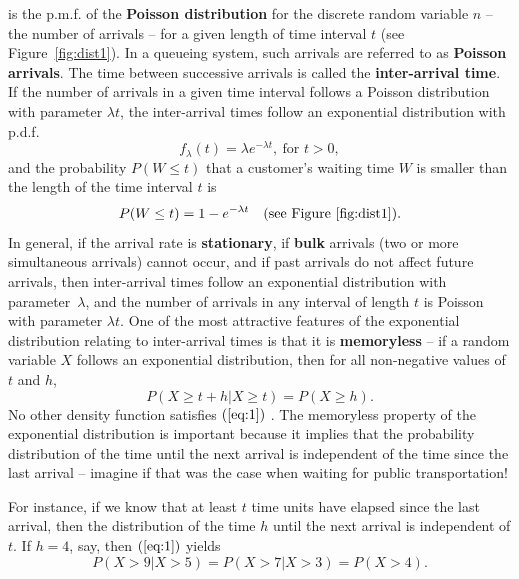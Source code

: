is the p.m.f. of the \textbf{Poisson distribution} for the discrete random variable $n$ -- the number of arrivals -- for a given length of time interval $t$ (see Figure~\ref{fig:dist1}). In a queueing system, such arrivals are referred to as \textbf{Poisson arrivals}. \newl The time between successive arrivals is called the \textbf{inter-arrival time}. If the number of arrivals in a given time interval follows a Poisson distribution with parameter $\lambda t$, the inter-arrival times follow an exponential distribution with p.d.f. 
$$ f_{\lambda}(t) = \lambda e^{-\lambda t}, \ \textrm{for }t>0,$$ and the probability $P(W\leq t)$ that a customer's waiting time $W$ is smaller than the length of the time interval $t$ is  
$$P(W\leq t) = 1 - e^{-\lambda t}\quad \textrm{(see Figure~\ref{fig:dist1})}.$$
In general, if the arrival rate is \textbf{stationary}, if \textbf{bulk} arrivals (two or more simultaneous arrivals) cannot occur, and if past arrivals do not affect future arrivals, then inter-arrival times follow an exponential distribution with parameter~$\lambda$, and the number of arrivals in any interval of length $t$ is Poisson with parameter $\lambda t$. \newl One of the most attractive features of the exponential distribution relating to inter-arrival times is that it is \textbf{memoryless} --  if a random variable $X$ follows an exponential distribution, then for all non-negative values of $t$ and $h$,
\begin{equation}
P(X \geq t + h|X \geq t) = P(X \geq h). 
\label{eq:1}
\end{equation}
No other density function satisfies $(\ref{eq:1})$ \cite{QS_R}. The memoryless property of the exponential distribution is important because it implies that the probability distribution of the time until the next arrival is independent of the time since the last arrival -- imagine if that was the case when waiting for public transportation! \par For instance, if we know that at least $t$ time units have elapsed since the last arrival, then the distribution of the time $h$ until the next arrival is independent of $t$. If $h=4$, say, then $(\ref{eq:1})$ yields 
$$ P(X>9|X>5)= P(X>7|X>3) = P(X>4).$$

